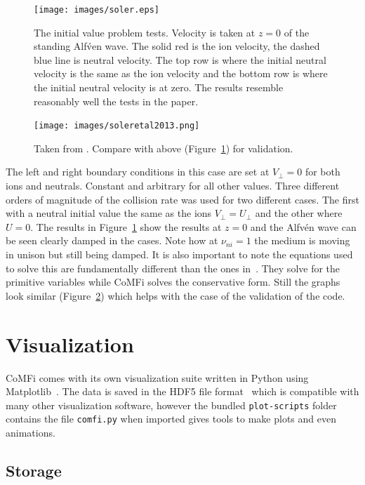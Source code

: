 \documentclass[12pt,upcase]{umlthesis}
\def\code#1{\texttt{#1}}
\begin{document}
\begin{figure}[ht!]
	\centering
	\texttt{[image: images/soler.eps]}
	\caption{The \citet{Soler2013} initial value problem tests. Velocity is taken at $z=0$ of the standing Alf\'ven wave. The solid red is the ion velocity, the dashed blue line is neutral velocity. The top row is where the initial neutral velocity is the same as the ion velocity and the bottom row is where the initial neutral velocity is at zero. The results resemble reasonably well the tests in the \citet{Soler2013} paper.}\label{fig:soler}
\end{figure}

\begin{figure}[ht!]
	\centering
	\texttt{[image: images/soleretal2013.png]}
	\caption{Taken from \citet{Soler2013}. Compare with above (Figure~\ref{fig:soler}) for validation.}\label{fig:soleretal2013}
\end{figure}

The left and right boundary conditions in this case are set at $V_{\perp} = 0$ for both ions and neutrals. Constant and arbitrary for all other values. Three different orders of magnitude of the collision rate was used for two different cases. The first with a neutral initial value the same as the ions $V_{\perp} = U_{\perp}$ and the other where $U=0$. The results in Figure~\ref{fig:soler} show the results at $z=0$ and the Alfv\'en wave can be seen clearly damped in the cases. Note how at $\nu_{ni}=1$ the medium is moving in unison but still being damped. It is also important to note the equations used to solve this are fundamentally different than the ones in~\citet{Soler2013}. They solve for the primitive variables while CoMFi solves the conservative form. Still the graphs look similar (Figure~\ref{fig:soleretal2013}) which helps with the case of the validation of the code.
\section{Visualization}\label{sec:visualization} 

CoMFi comes with its own visualization suite written in Python using Matplotlib~\citep{Hunter2007}. The data is saved in the HDF5 file format~\citep{hdf5} which is compatible with many other visualization software, however the bundled \code{plot-scripts} folder contains the file \code{comfi.py} when imported gives tools to make plots and even animations.

\subsection{Storage}
\end{document}
